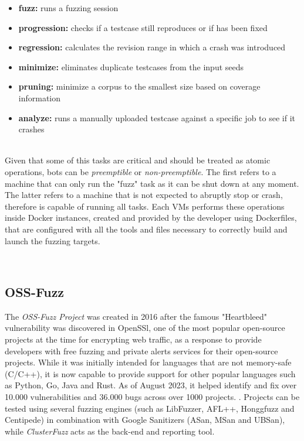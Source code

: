 \begin{itemize}
    \item \textbf{fuzz:} runs a fuzzing session
    \item \textbf{progression:} checks if a testcase still reproduces or if has been fixed
    \item \textbf{regression:} calculates the revision range in which a crash was introduced
    \item \textbf{minimize:} eliminates duplicate testcases from the input seeds
    \item \textbf{pruning:} minimize a corpus to the smallest size based on coverage information
    \item \textbf{analyze:} runs a manually uploaded testcase against a specific job to see if it crashes
\end{itemize}
\ \\
Given that some of this tasks are critical and should be treated as atomic operations, bots can be \textit{preemptible} or \textit{non-preemptible}.
\newline
The first refers to a machine that can only run the "fuzz" task as it can be shut down at any moment.
\newline
The latter refers to a machine that is not expected to abruptly stop or crash, therefore is capable of running all tasks.
\newline \newline \newline
Each VMs performs these operations inside Docker instances, created and provided by the developer using Dockerfiles, that are configured with all the tools and files necessary to correctly build and launch the fuzzing targets.


\ \\
\subsection{OSS-Fuzz}
The \textit{OSS-Fuzz Project} \cite{ossfuzz_paper} was created in 2016 after the famous "Heartbleed" vulnerability was discovered in OpenSSl, one of the most popular open-source projects at the time for encrypting web traffic, as a response to provide developers with free fuzzing and private alerts services for their open-source projects.
While it was initially intended for languages that are not memory-safe (C/C++), it is now capable to provide support for other popular languages such as Python, Go, Java and Rust.  
\newline
As of August 2023, it helped identify and fix over 10.000 vulnerabilities and 36.000 bugs across over 1000 projects. \cite{ossfuzz_docs}.
\newline \newline
Projects can be tested using several fuzzing engines (such as LibFuzzer, AFL++, Honggfuzz and Centipede) in combination with Google Sanitizers (ASan, MSan and UBSan), while \textit{ClusterFuzz} acts as the back-end and reporting tool.


